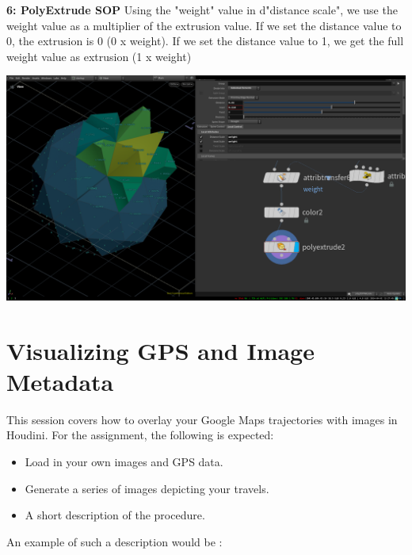 \documentclass[11pt, a4paper]{article}
\begin{document}
\begin{minipage}[H]{0.4\textwidth}
	\textbf{6: PolyExtrude SOP}\newline 
Using the "weight" value in d"distance scale", we use the weight value as a
multiplier of the extrusion value. If we set the distance value to 0, the
extrusion is 0 (0 x weight). If we set the distance value to 1, we get the full
weight value as extrusion (1 x weight) \end{minipage}
\vspace{1pt}
\begin{minipage}[H]{0.6\textwidth}
	\includegraphics[width=1\textwidth]{media/houdini_fundamentals_7.png}
\end{minipage}



\newpage
\section {Visualizing GPS and Image Metadata}

This session covers how to overlay your Google Maps trajectories with images in
Houdini. For the assignment, the following is expected:

\begin{itemize}
	\item Load in your own images and GPS data. 
	\item Generate a series of images depicting your travels.
	\item A short description of the procedure. 
\end{itemize}

An example of such a description would be :
\end{document}
